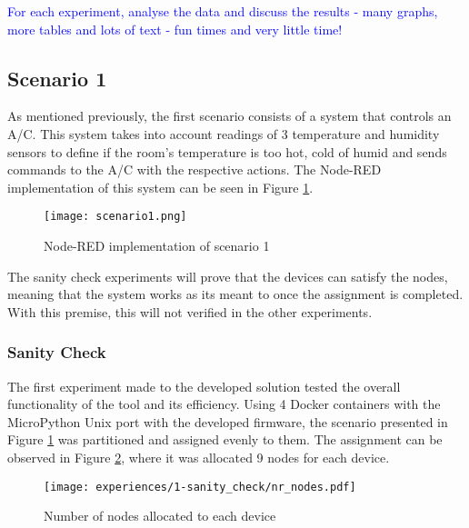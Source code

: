 \textcolor{blue}{For each experiment, analyse the data and discuss the results - many graphs, more tables and lots of text - fun times and very little time!}

\subsection{Scenario 1}\label{sec:discussion_scenario1}

As mentioned previously, the first scenario consists of a system that controls an A/C. This system takes into account readings of 3 temperature and humidity sensors to define if the room's temperature is too hot, cold of humid and sends commands to the A/C with the respective actions. The Node-RED implementation of this system can be seen in Figure \ref{fig:scenario1_node_red}.

\begin{figure}[h]
\centering
\texttt{[image: scenario1.png]}
\caption[Node-RED implementation of scenario 1]{Node-RED implementation of scenario 1}\label{fig:scenario1_node_red}
\end{figure}

The sanity check experiments will prove that the devices can satisfy the nodes, meaning that the system works as its meant to once the assignment is completed. With this premise, this will not verified in the other experiments.


\subsubsection{Sanity Check}

The first experiment made to the developed solution tested the overall functionality of the tool and its efficiency. Using 4 Docker containers with the MicroPython Unix port with the developed firmware, the scenario presented in Figure \ref{fig:scenario1_node_red} was partitioned and assigned evenly to them. The assignment can be observed in Figure \ref{fig:sanity_check_nr_nodes}, where it was allocated 9 nodes for each device.

\begin{figure}[h]
\centering
\texttt{[image: experiences/1-sanity\_check/nr\_nodes.pdf]}
\caption[Number of nodes allocated to each device]{Number of nodes allocated to each device}\label{fig:sanity_check_nr_nodes}
\end{figure}

